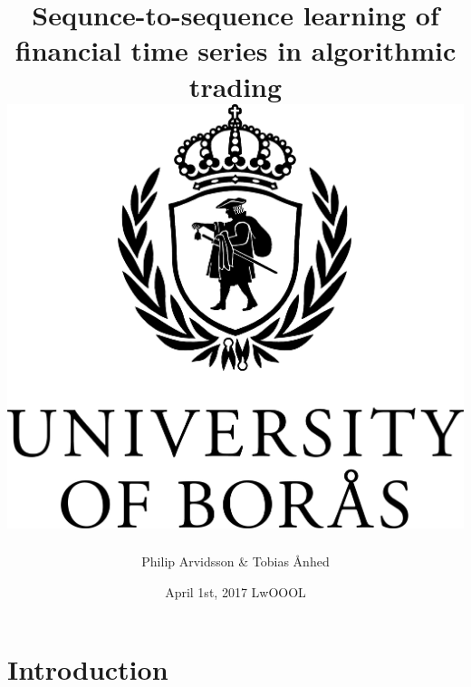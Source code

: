 \documentclass[11pt,twoside,openright]{book}
\title{
  {Sequnce-to-sequence learning of financial time series in algorithmic trading}\\
  \includegraphics[scale=0.1]{HB_EN_logo1_K}
}
\author{Philip Arvidsson \& Tobias Ånhed}
\date{April 1st, 2017 LwOOOL}
\begin{document}
\maketitle

\tableofcontents

\chapter{Introduction}

\end{document}
